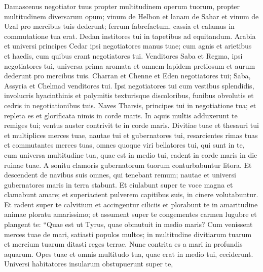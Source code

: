 \begin{biblechapter}
\begin{biblechapter}
\begin{biblechapter}
\begin{biblechapter}
\begin{biblechapter}
\begin{biblechapter}
\begin{biblechapter}
\begin{biblechapter}
\begin{biblechapter}
\begin{biblechapter}
\begin{biblechapter}
\begin{biblechapter}
\begin{biblechapter}
\begin{biblechapter}
\begin{biblechapter}
\begin{biblechapter}
\begin{biblechapter}
\begin{biblechapter}
\begin{biblechapter}
\begin{biblechapter}
\begin{biblechapter}
\begin{biblechapter}
\begin{biblechapter}
\begin{biblechapter}
\begin{biblechapter}
\begin{biblechapter}
\begin{biblechapter}
\verse Damascenus negotiator tuus propter multitudinem operum tuorum, propter multitudinem diversarum opum; vinum de Helbon et lanam de Sahar 
\verse et vinum de Uzal pro mercibus tuis dederunt; ferrum fabrefactum, cassia et calamus in commutatione tua erat. 
\verse Dedan institores tui in tapetibus ad equitandum. 
\verse Arabia et universi principes Cedar ipsi negotiatores manus tuae; cum agnis et arietibus et haedis, cum quibus erant negotiatores tui. 
 \verse Venditores Saba et Regma, ipsi negotiatores tui, universa prima aromata et omnem lapidem pretiosum et aurum dederunt pro mercibus tuis. 
\verse Charran et Chenne et Eden negotiatores tui; Saba, Assyria et Chelmad venditores tui. 
\verse Ipsi negotiatores tui cum vestibus splendidis, involucris hyacinthinis et polymitis texturisque discoloribus, funibus obvolutis et cedris in negotiationibus tuis.
 \verse Naves Tharsis, principes tui
 in negotiatione tua;
 et repleta es et glorificata nimis
 in corde maris.
 \verse In aquis multis adduxerunt te
 remiges tui;
 ventus auster contrivit te
 in corde maris.
 \verse Divitiae tuae et thesauri tui et multiplices merces tuae,
 nautae tui et gubernatores tui,
 resarcientes rimas tuas et commutantes merces tuas,
 omnes quoque viri bellatores tui,
 qui sunt in te,
 cum universa multitudine tua,
 quae est in medio tui,
 cadent in corde maris
 in die ruinae tuae.
 \verse A sonitu clamoris gubernatorum tuorum
 conturbabuntur litora.
 \verse Et descendent de navibus suis
 omnes, qui tenebant remum;
 nautae et universi gubernatores maris
 in terra stabunt.
 \verse Et eiulabunt super te voce magna
 et clamabunt amare;
 et superiacient pulverem capitibus suis,
 in cinere volutabuntur.
 \verse Et radent super te calvitium
 et accingentur ciliciis
 et plorabunt te in amaritudine animae
 ploratu amarissimo;
 \verse et assument super te congementes carmen lugubre
 et plangent te:
 “Quae est ut Tyrus, quae obmutuit
 in medio maris?
 \verse Cum venissent merces tuae de mari, satiasti populos multos;
 in multitudine divitiarum tuarum et mercium tuarum
 ditasti reges terrae.
 \verse Nunc contrita es a mari
 in profundis aquarum.
 Opes tuae et omnis multitudo tua,
 quae erat in medio tui,
 ceciderunt.
 \verse Universi habitatores insularum
 obstupuerunt super te,

\end{biblechapter}
\end{biblechapter}
\end{biblechapter}
\end{biblechapter}
\end{biblechapter}
\end{biblechapter}
\end{biblechapter}
\end{biblechapter}
\end{biblechapter}
\end{biblechapter}
\end{biblechapter}
\end{biblechapter}
\end{biblechapter}
\end{biblechapter}
\end{biblechapter}
\end{biblechapter}
\end{biblechapter}
\end{biblechapter}
\end{biblechapter}
\end{biblechapter}
\end{biblechapter}
\end{biblechapter}
\end{biblechapter}
\end{biblechapter}
\end{biblechapter}
\end{biblechapter}
\end{biblechapter}
